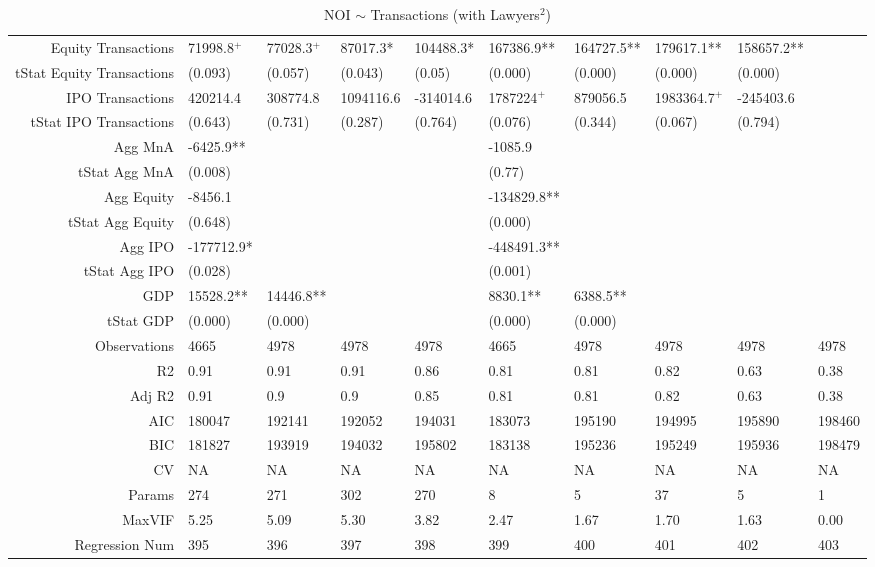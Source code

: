 \begin{table}[ht]
\begin{tabular}{rlllllllll}
  Equity Transactions & 71998.8$^{+}$ & 77028.3$^{+}$ & 87017.3* & 104488.3* & 167386.9** & 164727.5** & 179617.1** & 158657.2** &  \\ 
  tStat Equity Transactions & (0.093) & (0.057) & (0.043) & (0.05) & (0.000) & (0.000) & (0.000) & (0.000) &  \\ 
  IPO Transactions & 420214.4 & 308774.8 & 1094116.6 & -314014.6 & 1787224$^{+}$ & 879056.5 & 1983364.7$^{+}$ & -245403.6 &  \\ 
  tStat IPO Transactions & (0.643) & (0.731) & (0.287) & (0.764) & (0.076) & (0.344) & (0.067) & (0.794) &  \\ 
  Agg MnA & -6425.9** &  &  &  & -1085.9 &  &  &  &  \\ 
  tStat Agg MnA & (0.008) &  &  &  & (0.77) &  &  &  &  \\ 
  Agg Equity & -8456.1 &  &  &  & -134829.8** &  &  &  &  \\ 
  tStat Agg Equity & (0.648) &  &  &  & (0.000) &  &  &  &  \\ 
  Agg IPO & -177712.9* &  &  &  & -448491.3** &  &  &  &  \\ 
  tStat Agg IPO & (0.028) &  &  &  & (0.001) &  &  &  &  \\ 
  GDP & 15528.2** & 14446.8** &  &  & 8830.1** & 6388.5** &  &  &  \\ 
  tStat GDP & (0.000) & (0.000) &  &  & (0.000) & (0.000) &  &  &  \\ 
  Observations & 4665 & 4978 & 4978 & 4978 & 4665 & 4978 & 4978 & 4978 & 4978 \\ 
  R2 & 0.91 & 0.91 & 0.91 & 0.86 & 0.81 & 0.81 & 0.82 & 0.63 & 0.38 \\ 
  Adj R2 & 0.91 & 0.9 & 0.9 & 0.85 & 0.81 & 0.81 & 0.82 & 0.63 & 0.38 \\ 
  AIC & 180047 & 192141 & 192052 & 194031 & 183073 & 195190 & 194995 & 195890 & 198460 \\ 
  BIC & 181827 & 193919 & 194032 & 195802 & 183138 & 195236 & 195249 & 195936 & 198479 \\ 
  CV & NA & NA & NA & NA & NA & NA & NA & NA & NA \\ 
  Params & 274 & 271 & 302 & 270 & 8 & 5 & 37 & 5 & 1 \\ 
  MaxVIF & 5.25 & 5.09 & 5.30 & 3.82 & 2.47 & 1.67 & 1.70 & 1.63 & 0.00 \\ 
  Regression Num & 395 & 396 & 397 & 398 & 399 & 400 & 401 & 402 & 403 \\ 
   \hline
\end{tabular}
\caption{NOI $\sim$ Transactions (with Lawyers$^2$)} 
\end{table}
